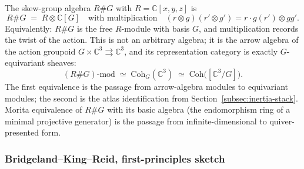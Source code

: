 The skew-group algebra $R \# G$ with $R = \mathbb{C}[x,y,z]$ is
\[
R \# G \;=\; R \otimes \mathbb{C}[G] \quad\text{with multiplication}\quad (r \otimes g)(r' \otimes g') = r \cdot g(r') \otimes gg'.
\]
Equivalently: $R \# G$ is the free $R$-module with basis $G$, and multiplication records the twist of the action. This is not an arbitrary algebra; it is the arrow algebra of the action groupoid $G \times \mathbb{C}^3 \rightrightarrows \mathbb{C}^3$, and its representation category is exactly $G$-equivariant sheaves:
\[
(R \# G)\text{-mod} \;\simeq\; \mathrm{Coh}_G(\mathbb{C}^3) \;\simeq\; \mathrm{Coh}\bigl([\mathbb{C}^3/G]\bigr).
\]
The first equivalence is the passage from arrow-algebra modules to equivariant modules; the second is the atlas identification from Section~\ref{subsec:inertia-stack}. Morita equivalence of $R \# G$ with its basic algebra (the endomorphism ring of a minimal projective generator) is the passage from infinite-dimensional to quiver-presented form.

\subsubsection{Bridgeland--King--Reid, first-principles sketch}
\label{subsec:bkr-first-principles}

